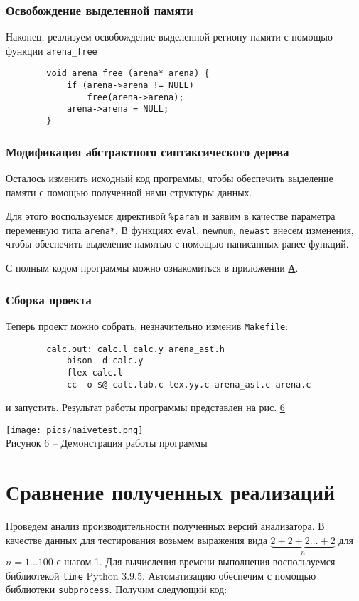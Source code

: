 \documentclass[bachelor, och, coursework]{SCWorks}
\begin{document}
    \subsubsection{Освобождение выделенной памяти}
    Наконец, реализуем освобождение выделенной региону памяти с помощью функции \verb"arena_free"
    \begin{verbatim}
        void arena_free (arena* arena) {
            if (arena->arena != NULL)
                free(arena->arena);
            arena->arena = NULL;
        }
    \end{verbatim}

    \subsubsection{Модификация абстрактного синтаксического дерева}
    Осталось изменить исходный код программы, чтобы обеспечить выделение памяти с помощью полученной 
    нами структуры данных.

    Для этого воспользуемся директивой \verb"%param" и заявим в качестве параметра переменную типа \verb"arena*". 
    В функциях \verb"eval", \verb"newnum", \verb"newast" внесем изменения, чтобы обеспечить выделение памятью с помощью 
    написанных ранее функций.

    С полным кодом программы можно ознакомиться в приложении \hyperref[А]{А}.

    \subsubsection{Сборка проекта}
    Теперь проект можно собрать, незначительно изменив \verb"Makefile":
    
    \begin{verbatim}
        calc.out: calc.l calc.y arena_ast.h
            bison -d calc.y
            flex calc.l
            cc -o $@ calc.tab.c lex.yy.c arena_ast.c arena.c
    \end{verbatim}

    и запустить. Результат работы программы представлен на рис. \hyperref[6]{6} 

    \begin{center}
        \texttt{[image: pics/naivetest.png]}\\
        {\small Рисунок 6 – Демонстрация работы программы}\label{6}
    \end{center}

    \section{Сравнение полученных реализаций}
    Проведем анализ производительности полученных версий анализатора. В 
    качестве данных для тестирования возьмем выражения вида $\underbrace{2 + 2 + 2 \dots + 2}_n $ 
    для $n = 1 \dots 100$ с шагом 1. Для вычисления времени выполнения воспользуемся библиотекой 
    \verb"time" Python 3.9.5. Автоматизацию обеспечим с помощью библиотеки \verb"subprocess". Получим следующий код:
    
\end{document}
